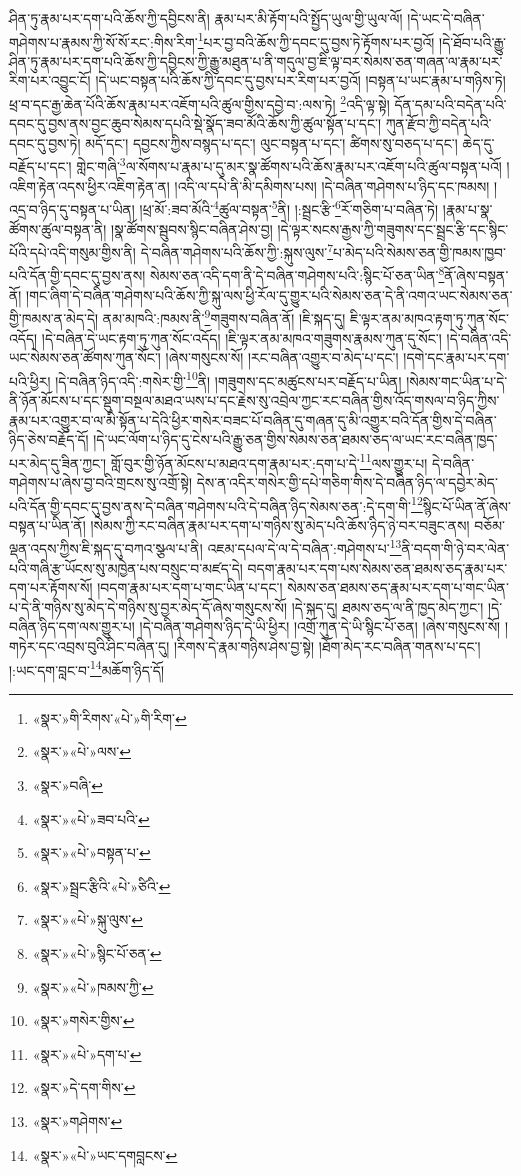 ཤིན་ཏུ་རྣམ་པར་དག་པའི་ཆོས་ཀྱི་དབྱིངས་ནི། རྣམ་པར་མི་རྟོག་པའི་སྤྱོད་ཡུལ་གྱི་ཡུལ་ལོ། །དེ་ཡང་དེ་བཞིན་གཤེགས་པ་རྣམས་ཀྱི་སོ་སོ་རང་:གིས་རིག་\footnote{«སྣར་»གི་རིགས་«པེ་»གི་རིག་}པར་བྱ་བའི་ཆོས་ཀྱི་དབང་དུ་བྱས་ཏེ་རྟོགས་པར་བྱའོ། །དེ་ཐོབ་པའི་རྒྱུ་ཤིན་ཏུ་རྣམ་པར་དག་པའི་ཆོས་ཀྱི་དབྱིངས་ཀྱི་རྒྱུ་མཐུན་པ་ནི་གདུལ་བྱ་ཇི་ལྟ་བར་སེམས་ཅན་གཞན་ལ་རྣམ་པར་རིག་པར་འབྱུང་ངོ། །དེ་ཡང་བསྟན་པའི་ཆོས་ཀྱི་དབང་དུ་བྱས་པར་རིག་པར་བྱའོ། །བསྟན་པ་ཡང་རྣམ་པ་གཉིས་ཏེ། ཕྲ་བ་དང་རྒྱ་ཆེན་པོའི་ཆོས་རྣམ་པར་འཇོག་པའི་ཚུལ་གྱིས་དབྱེ་བ་:ལས་ཏེ། \footnote{«སྣར་»«པེ་»ལས་}འདི་ལྟ་སྟེ། དོན་དམ་པའི་བདེན་པའི་དབང་དུ་བྱས་ནས་བྱང་ཆུབ་སེམས་དཔའི་སྡེ་སྣོད་ཟབ་མོའི་ཆོས་ཀྱི་ཚུལ་སྟོན་པ་དང་། ཀུན་རྫོབ་ཀྱི་བདེན་པའི་དབང་དུ་བྱས་ཏེ། མདོ་དང་། དབྱངས་ཀྱིས་བསྙད་པ་དང་། ལུང་བསྟན་པ་དང་། ཚིགས་སུ་བཅད་པ་དང་། ཆེད་དུ་བརྗོད་པ་དང་། གླེང་གཞི་\footnote{«སྣར་»བཞི་}ལ་སོགས་པ་རྣམ་པ་དུ་མར་སྣ་ཚོགས་པའི་ཆོས་རྣམ་པར་འཇོག་པའི་ཚུལ་བསྟན་པའོ། །འཇིག་རྟེན་འདས་ཕྱིར་འཇིག་རྟེན་ན། །འདི་ལ་དཔེ་ནི་མི་དམིགས་པས། །དེ་བཞིན་གཤེགས་པ་ཉིད་དང་ཁམས། །འདྲ་བ་ཉིད་དུ་བསྟན་པ་ཡིན། །ཕྲ་མོ་:ཟབ་མོའི་\footnote{«སྣར་»«པེ་»ཟབ་པའི་}ཚུལ་བསྟན་\footnote{«སྣར་»«པེ་»བསྟན་པ་}ནི། །:སྦྲང་རྩི་\footnote{«སྣར་»སྦྲང་རྩིའི་«པེ་»ཙིའི་}རོ་གཅིག་པ་བཞིན་ཏེ། །རྣམ་པ་སྣ་ཚོགས་ཚུལ་བསྟན་ནི། །སྣ་ཚོགས་སྦུབས་སྙིང་བཞིན་ཤེས་བྱ། །དེ་ལྟར་སངས་རྒྱས་ཀྱི་གཟུགས་དང་སྦྲང་རྩི་དང་སྙིང་པོའི་དཔེ་འདི་གསུམ་གྱིས་ནི། དེ་བཞིན་གཤེགས་པའི་ཆོས་ཀྱི་:སྐུས་ལུས་\footnote{«སྣར་»«པེ་»སྐུ་ལུས་}པ་མེད་པའི་སེམས་ཅན་གྱི་ཁམས་ཁྱབ་པའི་དོན་གྱི་དབང་དུ་བྱས་ནས། སེམས་ཅན་འདི་དག་ནི་དེ་བཞིན་གཤེགས་པའི་:སྙིང་པོ་ཅན་ཡིན་\footnote{«སྣར་»«པེ་»སྙིང་པོ་ཅན་}ནོ་ཞེས་བསྟན་ནོ། །གང་ཞིག་དེ་བཞིན་གཤེགས་པའི་ཆོས་ཀྱི་སྐུ་ལས་ཕྱི་རོལ་དུ་གྱུར་པའི་སེམས་ཅན་དེ་ནི་འགའ་ཡང་སེམས་ཅན་གྱི་ཁམས་ན་མེད་དེ། ནམ་མཁའི་:ཁམས་ནི་\footnote{«སྣར་»«པེ་»ཁམས་ཀྱི་}གཟུགས་བཞིན་ནོ། །ཇི་སྐད་དུ། ཇི་ལྟར་ནམ་མཁའ་རྟག་ཏུ་ཀུན་སོང་འདོད། །དེ་བཞིན་དེ་ཡང་རྟག་ཏུ་ཀུན་སོང་འདོད། །ཇི་ལྟར་ནམ་མཁའ་གཟུགས་རྣམས་ཀུན་དུ་སོང་། །དེ་བཞིན་འདི་ཡང་སེམས་ཅན་ཚོགས་ཀུན་སོང་། །ཞེས་གསུངས་སོ། །རང་བཞིན་འགྱུར་བ་མེད་པ་དང་། །དགེ་དང་རྣམ་པར་དག་པའི་ཕྱིར། །དེ་བཞིན་ཉིད་འདི་:གསེར་གྱི་\footnote{«སྣར་»གསེར་གྱིས་}ནི། །གཟུགས་དང་མཚུངས་པར་བརྗོད་པ་ཡིན། །སེམས་གང་ཡིན་པ་དེ་ནི་ཉོན་མོངས་པ་དང་སྡུག་བསྔལ་མཐའ་ཡས་པ་དང་རྗེས་སུ་འབྲེལ་ཀྱང་རང་བཞིན་གྱིས་འོད་གསལ་བ་ཉིད་ཀྱིས་རྣམ་པར་འགྱུར་བ་ལ་མི་སྟོན་པ་དེའི་ཕྱིར་གསེར་བཟང་པོ་བཞིན་དུ་གཞན་དུ་མི་འགྱུར་བའི་དོན་གྱིས་དེ་བཞིན་ཉིད་ཅེས་བརྗོད་དོ། །དེ་ཡང་ལོག་པ་ཉིད་དུ་ངེས་པའི་རྒྱུ་ཅན་གྱིས་སེམས་ཅན་ཐམས་ཅད་ལ་ཡང་རང་བཞིན་ཁྱད་པར་མེད་དུ་ཟིན་ཀྱང་། གློ་བུར་གྱི་ཉོན་མོངས་པ་མཐའ་དག་རྣམ་པར་:དག་པ་དེ་\footnote{«སྣར་»«པེ་»དག་པ་}ལས་གྱུར་པ། དེ་བཞིན་གཤེགས་པ་ཞེས་བྱ་བའི་གྲངས་སུ་འགྲོ་སྟེ། དེས་ན་འདིར་གསེར་གྱི་དཔེ་གཅིག་གིས་དེ་བཞིན་ཉིད་ལ་དབྱེར་མེད་པའི་དོན་གྱི་དབང་དུ་བྱས་ནས་དེ་བཞིན་གཤེགས་པའི་དེ་བཞིན་ཉིད་སེམས་ཅན་:དེ་དག་གི་\footnote{«སྣར་»དེ་དག་གིས་}སྙིང་པོ་ཡིན་ནོ་ཞེས་བསྟན་པ་ཡིན་ནོ། །སེམས་ཀྱི་རང་བཞིན་རྣམ་པར་དག་པ་གཉིས་སུ་མེད་པའི་ཆོས་ཉིད་ཉེ་བར་བཟུང་ནས། བཅོམ་ལྡན་འདས་ཀྱིས་ཇི་སྐད་དུ་བཀའ་སྩལ་པ་ནི། འཇམ་དཔལ་དེ་ལ་དེ་བཞིན་:གཤེགས་པ་\footnote{«སྣར་»གཤེགས་}ནི་བདག་གི་ཉེ་བར་ལེན་པའི་གཞི་རྩ་ཡོངས་སུ་མཁྱེན་པས་བསྲུང་བ་མཛད་དེ། བདག་རྣམ་པར་དག་པས་སེམས་ཅན་ཐམས་ཅད་རྣམ་པར་དག་པར་རྟོགས་སོ། །བདག་རྣམ་པར་དག་པ་གང་ཡིན་པ་དང་། སེམས་ཅན་ཐམས་ཅད་རྣམ་པར་དག་པ་གང་ཡིན་པ་དེ་ནི་གཉིས་སུ་མེད་དེ་གཉིས་སུ་བྱར་མེད་དོ་ཞེས་གསུངས་སོ། །དེ་སྐད་དུ། ཐམས་ཅད་ལ་ནི་ཁྱད་མེད་ཀྱང་། །དེ་བཞིན་ཉིད་དག་ལས་གྱུར་པ། །དེ་བཞིན་གཤེགས་ཉིད་དེ་ཡི་ཕྱིར། །འགྲོ་ཀུན་དེ་ཡི་སྙིང་པོ་ཅན། །ཞེས་གསུངས་སོ། །གཏེར་དང་འབྲས་བུའི་ཤིང་བཞིན་དུ། །རིགས་དེ་རྣམ་གཉིས་ཤེས་བྱ་སྟེ། །ཐོག་མེད་རང་བཞིན་གནས་པ་དང་། །:ཡང་དག་བླང་བ་\footnote{«སྣར་»«པེ་»ཡང་དགབླངས་}མཆོག་ཉིད་དོ། 